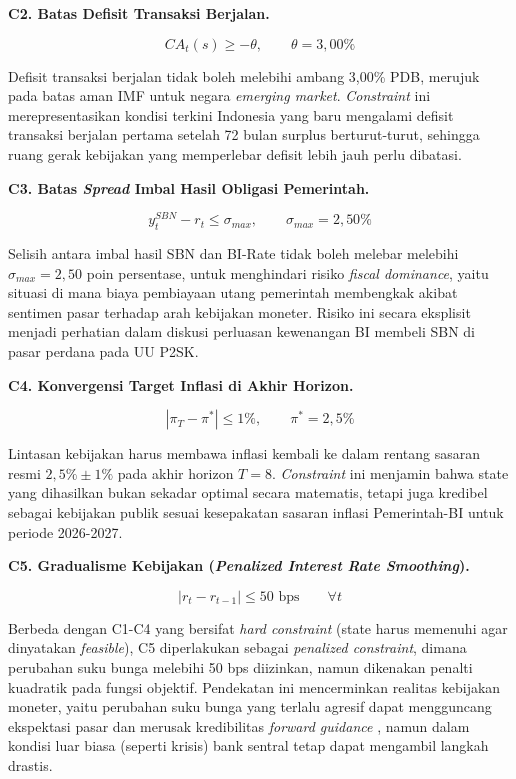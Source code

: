 \textbf{C2. Batas Defisit Transaksi Berjalan.}

\[
    CA_t(s) \geq -\theta, \qquad \theta = 3{,}00\%
\]

Defisit transaksi berjalan tidak boleh melebihi ambang 3,00\% PDB, merujuk pada batas aman IMF untuk negara \textit{emerging market}. \textit{Constraint} ini merepresentasikan kondisi terkini Indonesia yang baru mengalami defisit transaksi berjalan pertama setelah 72 bulan surplus berturut-turut, sehingga ruang gerak kebijakan yang memperlebar defisit lebih jauh perlu dibatasi.

\textbf{C3. Batas \textit{Spread} Imbal Hasil Obligasi Pemerintah.}

\[
    y_t^{SBN} - r_t \leq \sigma_{max}, \qquad \sigma_{max} = 2{,}50\%
\]

Selisih antara imbal hasil SBN dan BI-Rate tidak boleh melebar melebihi $\sigma_{max} = 2{,}50$ poin persentase, untuk menghindari risiko \textit{fiscal dominance}, yaitu situasi di mana biaya pembiayaan utang pemerintah membengkak akibat sentimen pasar terhadap arah kebijakan moneter. Risiko ini secara eksplisit menjadi perhatian dalam diskusi perluasan kewenangan BI membeli SBN di pasar perdana pada UU P2SK.

\textbf{C4. Konvergensi Target Inflasi di Akhir Horizon.}

\[
    \left| \pi_T - \pi^{*} \right| \leq 1\%, \qquad \pi^{*} = 2{,}5\%
\]

Lintasan kebijakan harus membawa inflasi kembali ke dalam rentang sasaran resmi $2{,}5\% \pm 1\%$ pada akhir horizon $T = 8$. \textit{Constraint} ini menjamin bahwa state yang dihasilkan bukan sekadar optimal secara matematis, tetapi juga kredibel sebagai kebijakan publik sesuai kesepakatan sasaran inflasi Pemerintah-BI untuk periode 2026-2027.

\textbf{C5. Gradualisme Kebijakan (\textit{Penalized Interest Rate Smoothing}).}

\[
    \left| r_t - r_{t-1} \right| \leq 50 \text{ bps} \qquad \forall t
\]

Berbeda dengan C1-C4 yang bersifat \textit{hard constraint} (state harus memenuhi agar dinyatakan \textit{feasible}), C5 diperlakukan sebagai \textit{penalized constraint}, dimana perubahan suku bunga melebihi 50 bps diizinkan, namun dikenakan penalti kuadratik pada fungsi objektif. Pendekatan ini mencerminkan realitas kebijakan moneter, yaitu perubahan suku bunga yang terlalu agresif dapat mengguncang ekspektasi pasar dan merusak kredibilitas \textit{forward guidance} \cite{woodford2003}, namun dalam kondisi luar biasa (seperti krisis) bank sentral tetap dapat mengambil langkah drastis.

